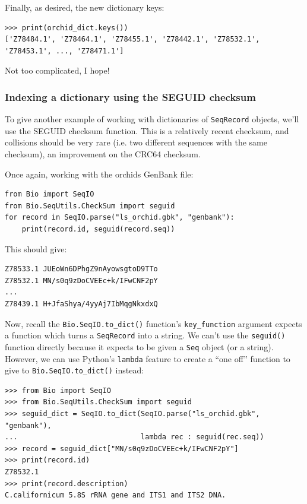 \documentclass{report}
\begin{document}
\noindent Finally, as desired, the new dictionary keys:

\begin{verbatim}
>>> print(orchid_dict.keys())
['Z78484.1', 'Z78464.1', 'Z78455.1', 'Z78442.1', 'Z78532.1', 'Z78453.1', ..., 'Z78471.1']
\end{verbatim}

\noindent Not too complicated, I hope!

\subsubsection{Indexing a dictionary using the SEGUID checksum}

To give another example of working with dictionaries of \verb|SeqRecord| objects, we'll use the SEGUID checksum function.  This is a relatively recent checksum, and collisions should be very rare (i.e. two different sequences with the same checksum), an improvement on the CRC64 checksum.

Once again, working with the orchids GenBank file:

\begin{verbatim}
from Bio import SeqIO
from Bio.SeqUtils.CheckSum import seguid
for record in SeqIO.parse("ls_orchid.gbk", "genbank"):
    print(record.id, seguid(record.seq))
\end{verbatim}

\noindent This should give:

\begin{verbatim}
Z78533.1 JUEoWn6DPhgZ9nAyowsgtoD9TTo
Z78532.1 MN/s0q9zDoCVEEc+k/IFwCNF2pY
...
Z78439.1 H+JfaShya/4yyAj7IbMqgNkxdxQ
\end{verbatim}

Now, recall the \verb|Bio.SeqIO.to_dict()| function's \verb|key_function| argument expects a function which turns a \verb|SeqRecord| into a string.  We can't use the \verb|seguid()| function directly because it expects to be given a \verb|Seq| object (or a string).  However, we can use Python's \verb|lambda| feature to create a ``one off'' function to give to \verb|Bio.SeqIO.to_dict()| instead:

\begin{verbatim}
>>> from Bio import SeqIO
>>> from Bio.SeqUtils.CheckSum import seguid
>>> seguid_dict = SeqIO.to_dict(SeqIO.parse("ls_orchid.gbk", "genbank"),
...                             lambda rec : seguid(rec.seq))
>>> record = seguid_dict["MN/s0q9zDoCVEEc+k/IFwCNF2pY"]
>>> print(record.id)
Z78532.1
>>> print(record.description)
C.californicum 5.8S rRNA gene and ITS1 and ITS2 DNA.
\end{verbatim}
\end{document}
